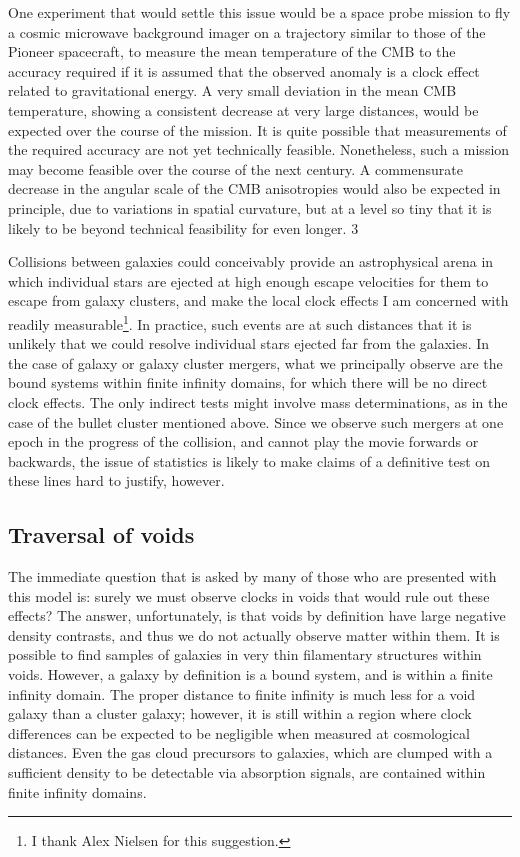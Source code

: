 \documentclass[12pt]{article}
\begin{document}
One experiment that would settle this issue would be a space probe mission
to fly a cosmic microwave background imager on a trajectory similar
to those of the Pioneer spacecraft, to measure the mean temperature of
the CMB to the accuracy required if it is assumed that the observed
anomaly is a clock effect related to gravitational energy. A very small
deviation in the mean CMB temperature, showing a consistent decrease at
very large distances, would be expected over the course
of the mission. It is quite possible that measurements of the required
accuracy are not yet technically feasible. Nonetheless, such a mission
may become feasible over the course of the next century. A commensurate
decrease in the angular scale of the CMB anisotropies would also be
expected in principle, due to variations in spatial curvature, but at a
level so tiny that it is likely to be beyond technical feasibility for
even longer.
\setcounter{footnote}3

Collisions between galaxies could conceivably provide an astrophysical arena
in which individual stars are ejected at high enough escape velocities for
them to escape from galaxy clusters, and make the local clock effects I am
concerned with readily measurable\footnote{I thank Alex Nielsen for this
suggestion.}. In practice, such events are at such distances that it is
unlikely that we could resolve individual stars ejected far from the
galaxies. In the case of galaxy or galaxy cluster mergers, what we principally
observe are the bound systems within finite infinity domains, for which there
will be no direct clock effects. The only indirect tests might involve mass
determinations, as in the case of the bullet cluster mentioned above.
Since we observe such mergers at one epoch in the progress of the collision,
and cannot play the movie forwards or backwards, the issue of statistics
\cite{Hayashi} is likely to make claims of a definitive test on these
lines hard to justify, however.

\subsection{Traversal of voids}

The immediate question that is asked by many of those who are presented with
this model is: surely we must observe clocks in voids that would rule
out these effects? The answer, unfortunately, is that voids by definition
have large negative density contrasts, and thus we do not actually observe
matter within them. It is possible to find samples of galaxies in very
thin filamentary structures within voids. However, a galaxy by definition
is a bound system, and is within a finite infinity domain. The proper
distance to finite infinity is much less for a void galaxy than a cluster
galaxy; however, it is still within a region where clock differences can be
expected to be negligible when measured at cosmological distances.
Even the gas cloud precursors to galaxies, which are clumped with
a sufficient density to be detectable via absorption signals, are contained
within finite infinity domains.
\end{document}

